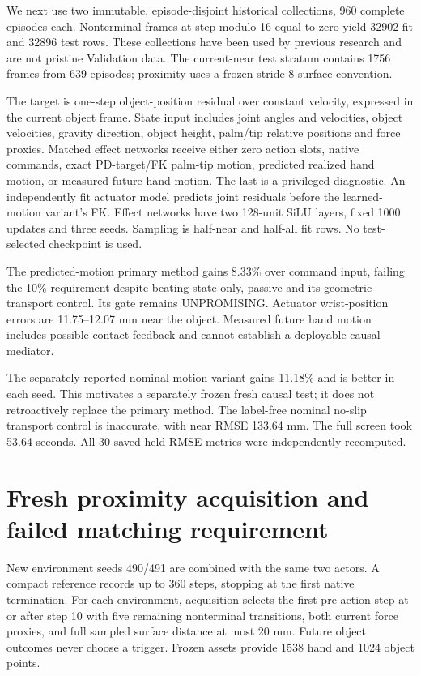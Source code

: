 \documentclass[10pt]{article}
\begin{document}
We next use two immutable, episode-disjoint historical collections, 960 complete
episodes each. Nonterminal frames at step modulo 16 equal to zero yield 32902 fit
and 32896 test rows. These collections have been used by previous research and are
not pristine Validation data. The current-near test stratum contains 1756 frames
from 639 episodes; proximity uses a frozen stride-8 surface convention.

The target is one-step object-position residual over constant velocity, expressed
in the current object frame. State input includes joint angles and velocities,
object velocities, gravity direction, object height, palm/tip relative positions
and force proxies. Matched effect networks receive either zero action slots, native
commands, exact PD-target/FK palm-tip motion, predicted realized hand motion, or
measured future hand motion. The last is a privileged diagnostic. An independently
fit actuator model predicts joint residuals before the learned-motion variant's FK.
Effect networks have two 128-unit SiLU layers, fixed 1000 updates and three seeds.
Sampling is half-near and half-all fit rows. No test-selected checkpoint is used.

\begin{table}[h]
\centering

\caption{Archived one-step vector prediction error, seed-mean millimeters. Near and all-state strata differ.}
\end{table}

The predicted-motion primary method gains 8.33\% over command input, failing the
10\% requirement despite beating state-only, passive and its geometric transport
control. Its gate remains UNPROMISING. Actuator wrist-position errors are
11.75--12.07 mm near the object. Measured future hand motion includes possible
contact feedback and cannot establish a deployable causal mediator.

The separately reported nominal-motion variant gains 11.18\% and is better in each
seed. This motivates a separately frozen fresh causal test; it does not retroactively
replace the primary method. The label-free nominal no-slip transport control is
inaccurate, with near RMSE 133.64 mm. The full screen took 53.64 seconds. All 30
saved held RMSE metrics were independently recomputed.

\section{Fresh proximity acquisition and failed matching requirement}
New environment seeds 490/491 are combined with the same two actors. A compact
reference records up to 360 steps, stopping at the first native termination.
For each environment, acquisition selects the first pre-action step at or after
step 10 with five remaining nonterminal transitions, both current force proxies,
and full sampled surface distance at most 20 mm. Future object outcomes never
choose a trigger. Frozen assets provide 1538 hand and 1024 object points.
\end{document}
